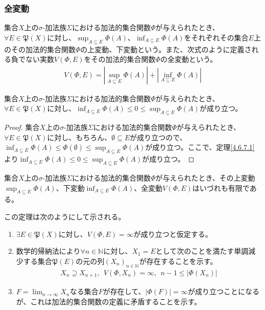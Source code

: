 \documentclass[dvipdfmx]{jsarticle}
\begin{document}
\subsubsection{全変動}%
\begin{dfn}
集合$X$上の$\sigma$-加法族$\varSigma$における加法的集合関数$\varPhi$が与えられたとき、$\forall E \in \mathfrak{P}(X)$に対し、$\sup_{A \subseteq E}{\varPhi(A)}$、$\inf_{A \subseteq E}{\varPhi(A)}$をそれぞれその集合$E$上のその加法的集合関数$\varPhi$の上変動、下変動という。また、次式のように定義される負でない実数$V(\varPhi,E)$をその加法的集合関数$\varPhi$の全変動という。
\begin{align*}
V(\varPhi,E) = \left| \sup_{A \subseteq E}{\varPhi(A)} \right| + \left| \inf_{A \subseteq E}{\varPhi(A)} \right|
\end{align*}
\end{dfn}
\begin{thm}\label{4.6.7.7}
集合$X$上の$\sigma$-加法族$\varSigma$における加法的集合関数$\varPhi$が与えられたとき、$\forall E \in \mathfrak{P}(X)$に対し、$\inf_{A \subseteq E}{\varPhi(A)} \leq 0 \leq \sup_{A \subseteq E}{\varPhi(A)}$が成り立つ。
\end{thm}
\begin{proof}
集合$X$上の$\sigma$-加法族$\varSigma$における加法的集合関数$\varPhi$が与えられたとき、$\forall E \in \mathfrak{P}(X)$に対し、もちろん、$\emptyset \subseteq E$が成り立つので、$\inf_{A \subseteq E}{\varPhi(A)} \leq \varPhi(\emptyset) \leq \sup_{A \subseteq E}{\varPhi(A)}$が成り立つ。ここで、定理\ref{4.6.7.1}より$\inf_{A \subseteq E}{\varPhi(A)} \leq 0 \leq \sup_{A \subseteq E}{\varPhi(A)}$が成り立つ。
\end{proof}
\begin{thm}\label{4.6.7.8}
集合$X$上の$\sigma$-加法族$\varSigma$における加法的集合関数$\varPhi$が与えられたとき、その上変動$\sup_{A \subseteq E}{\varPhi(A)}$、下変動$\inf_{A \subseteq E}{\varPhi(A)}$、全変動$V(\varPhi,E)$はいづれも有限である。
\end{thm}\par
この定理は次のようにして示される。
\begin{enumerate}
\item
  $\exists E \in \mathfrak{P}(X)$に対し、$V(\varPhi,E) = \infty$が成り立つと仮定する。
\item
  数学的帰納法により$\forall n \in \mathbb{N}$に対し、$X_{1} = E$として次のことを満たす単調減少する集合$\mathfrak{P}(E)$の元の列$\left( X_{n} \right)_{n \in \mathbb{N}}$が存在することを示す。
\begin{align*}
X_{n} \supseteq X_{n + 1},\ \ V\left( \varPhi,X_{n} \right) = \infty,\ \ n - 1 \leq \left| \varPhi\left( X_{n} \right) \right|
\end{align*}
\item
  $F = \lim_{n \rightarrow \infty}X_{n}$なる集合$F$が存在して、$\left| \varPhi(F) \right| = \infty$が成り立つことになるが、これは加法的集合関数の定義に矛盾することを示す。
\end{enumerate}
\end{document}
